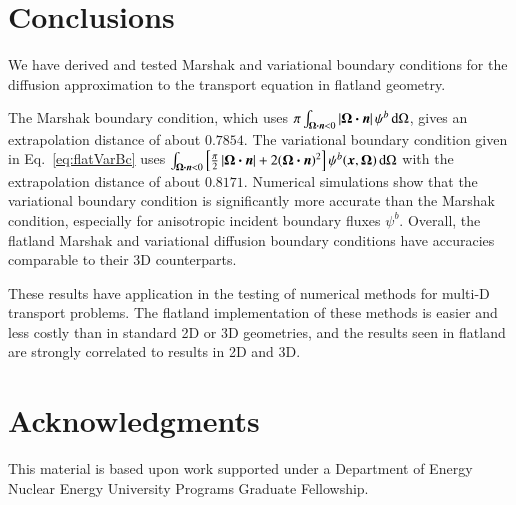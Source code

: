 \documentclass{anstrans}
\begin{document}
\section{Conclusions}
We have derived and tested Marshak and variational boundary
conditions for the diffusion approximation to the transport equation in
flatland geometry. 

The Marshak boundary condition, which uses $\pi \int_{\bm{\Omega}\bm{\cdot} \bm{n} <
0 } \left| \bm{\Omega}\bm{\cdot} \bm{n} \right| \psi^b \mathop{}\!\mathrm{d}\Omega$, gives an extrapolation
distance of about $0.7854$.  The variational boundary condition given in
Eq.~\eqref{eq:flatVarBc} uses $\int_{\bm{\Omega}\bm{\cdot}\bm{n} < 0} \left[
\frac{\pi}{2} \left| \bm{\Omega}\bm{\cdot}\bm{n} \right| + 2 (\bm{\Omega}\bm{\cdot}\bm{n})^2
\right] \psi^b(\bm{x}, \bm{\Omega}) \mathop{}\!\mathrm{d}\Omega$ with the extrapolation
distance of about $0.8171$. Numerical simulations show that the variational
boundary condition is significantly more accurate than the Marshak condition,
especially for anisotropic incident boundary fluxes $\psi^b$. Overall, the
flatland Marshak and variational diffusion boundary conditions have accuracies
comparable to their 3D counterparts. 

These results have application in the testing of numerical methods for multi-D
transport problems. The flatland implementation of these methods is easier and
less costly than in standard 2D or 3D geometries, and the results seen in
flatland are strongly correlated to results in 2D and 3D.

\section{Acknowledgments}
This material is based upon work supported under a Department of Energy Nuclear
Energy University Programs Graduate Fellowship.



\end{document}
